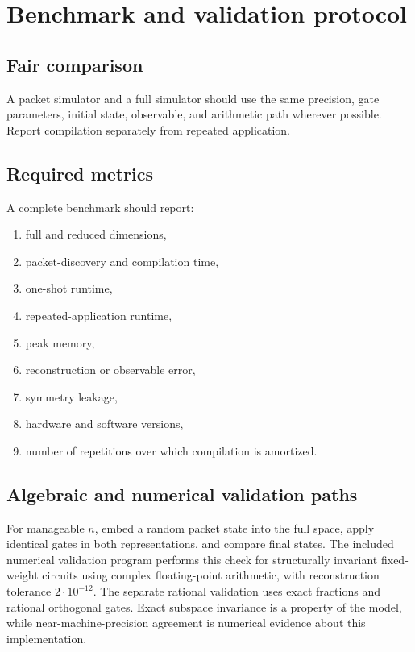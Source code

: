 \chapter{Benchmark and validation protocol}
\label{ch:benchmark-protocol}

\section{Fair comparison}
A packet simulator and a full simulator should use the same precision, gate parameters, initial state, observable, and arithmetic path wherever possible. Report compilation separately from repeated application.

\section{Required metrics}
A complete benchmark should report:

\begin{enumerate}
\item full and reduced dimensions,
\item packet-discovery and compilation time,
\item one-shot runtime,
\item repeated-application runtime,
\item peak memory,
\item reconstruction or observable error,
\item symmetry leakage,
\item hardware and software versions,
\item number of repetitions over which compilation is amortized.
\end{enumerate}

\section{Algebraic and numerical validation paths}
For manageable $n$, embed a random packet state into the full space, apply identical gates in both representations, and compare final states. The included numerical validation program performs this check for structurally invariant fixed-weight circuits using complex floating-point arithmetic, with reconstruction tolerance $2\cdot10^{-12}$. The separate rational validation uses exact fractions and rational orthogonal gates. Exact subspace invariance is a property of the model, while near-machine-precision agreement is numerical evidence about this implementation.


